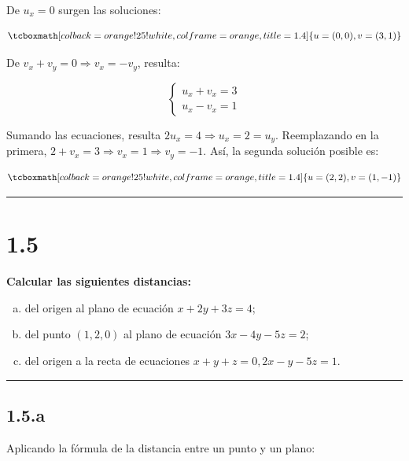 \documentclass{article}
\begin{document}
De $u_x = 0$ surgen las soluciones:

\begin{equation}
\tcboxmath[colback=orange!25!white,colframe=orange,title=1.4]
{ u = (0,0), v = (3, 1) }
\end{equation}

De $v_x + v_y = 0 \Rightarrow v_x = -v_y$, resulta:

\begin{equation}
\left\{ \begin{array}{ll}
u_x + v_x = 3 \\
u_x - v_x = 1
\end{array} \right.
\end{equation}

Sumando las ecuaciones, resulta $2 u_x = 4 \Rightarrow u_x = 2 = u_y$. Reemplazando en la primera, $2 + v_x = 3 \Rightarrow v_x = 1 \Rightarrow v_y = -1$. Así, la segunda solución posible es:

\begin{equation}
\tcboxmath[colback=orange!25!white,colframe=orange,title=1.4]
{ u = (2,2), v = (1, -1) }
\end{equation}

\hrule
\vspace{10 pt}

\section*{1.5}
\label{sec:1.5}

\textbf{Calcular las siguientes distancias:} 

\begin{enumerate}[(a)]
\bfseries
\item del origen al plano de ecuación $x + 2y +3z = 4$;

\item del punto $(1, 2, 0)$ al plano de ecuación $3x - 4y - 5z = 2$;

\item del origen a la recta de ecuaciones $x + y + z = 0, 2x - y -5z = 1$.
\end{enumerate}
\hrule

\subsection*{1.5.a}
\label{subsec:1.5.a}

Aplicando la fórmula de la distancia entre un punto y un plano:
\end{document}

